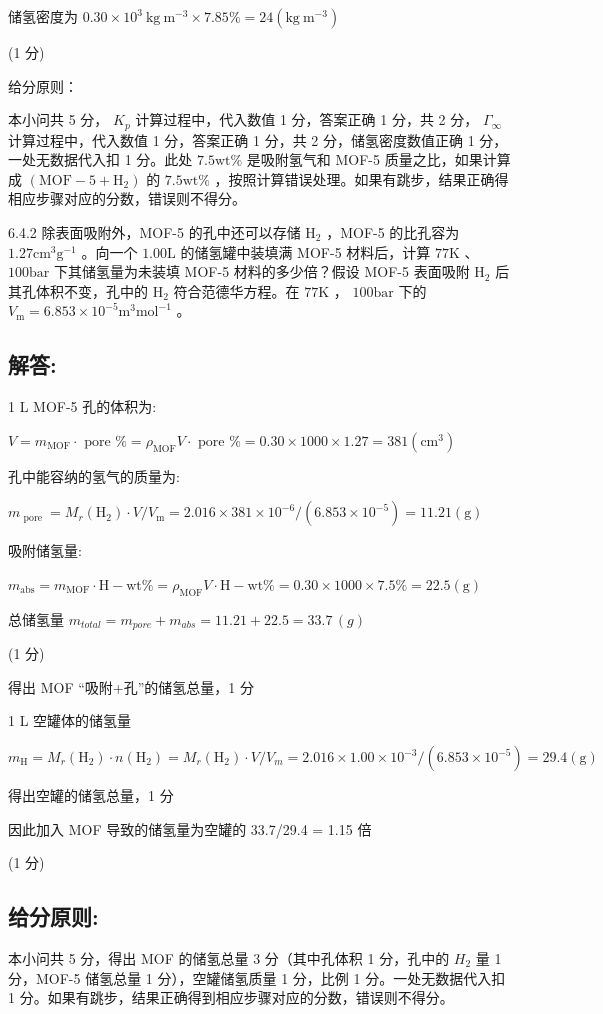 储氢密度为 $0.30 \times 10^{3} \mathrm{~kg} \mathrm{~m}^{-3} \times 7.85\% = 24 (\mathrm{kg} \mathrm{~m}^{-3})$

(1 分)

给分原则：

本小问共 5 分， $K_{p}$ 计算过程中，代入数值 1 分，答案正确 1 分，共 2 分， $\Gamma_{\infty}$ 计算过程中，代入数值 1 分，答案正确 1 分，共 2 分，储氢密度数值正确 1 分，一处无数据代入扣 1 分。此处 $7.5 \mathrm{wt}\%$ 是吸附氢气和 MOF-5 质量之比，如果计算成 $(\mathrm{MOF} - 5 + \mathrm{H}_{2})$ 的 $7.5 \mathrm{wt}\%$ ，按照计算错误处理。如果有跳步，结果正确得相应步骤对应的分数，错误则不得分。

6.4.2 除表面吸附外，MOF-5 的孔中还可以存储 $\mathrm{H}_{2}$ ，MOF-5 的比孔容为 $1.27\mathrm{cm}^{3}\mathrm{g}^{-1}$ 。向一个 $1.00\mathrm{L}$ 的储氢罐中装填满 MOF-5 材料后，计算 $77\mathrm{K}$ 、 $100\mathrm{bar}$ 下其储氢量为未装填 MOF-5 材料的多少倍？假设 MOF-5 表面吸附 $\mathrm{H}_{2}$ 后其孔体积不变，孔中的 $\mathrm{H}_{2}$ 符合范德华方程。在 $77\mathrm{K}$ ， $100\mathrm{bar}$ 下的 $V_{\mathrm{m}} = 6.853 \times 10^{-5}\mathrm{m}^{3}\mathrm{mol}^{-1}$ 。

\subsection*{解答:}

1 L MOF-5 孔的体积为:

$
V = m _ {\mathrm{MOF}} \cdot \text { pore } \% = \rho_ {\mathrm{MOF}} V \cdot \text { pore } \% = 0. 3 0 \times 1 0 0 0 \times 1. 2 7 = 3 8 1 (\mathrm{cm} ^ {3})\tag{1 分}
$

孔中能容纳的氢气的质量为:

$
m _ {\text { pore }} = M _ {r} \left(\mathrm{H} _ {2}\right) \cdot V / V _ {\mathrm{m}} = 2. 0 1 6 \times 3 8 1 \times 1 0 ^ {- 6} / (6. 8 5 3 \times 1 0 ^ {- 5}) = 1 1. 2 1 (\mathrm{g})\tag{1 分}
$

吸附储氢量:

$
m _ {\mathrm{abs}} = m _ {\mathrm{MOF}} \cdot \mathrm{H} - \mathrm{wt} \% = \rho_ {\mathrm{MOF}} V \cdot \mathrm{H} - \mathrm{wt} \% = 0. 3 0 \times 1 0 0 0 \times 7. 5 \% = 2 2. 5 (\mathrm{g})
$

总储氢量 $m_{total} = m_{pore} + m_{abs} = 11.21 + 22.5 = 33.7 \, (g)$

(1 分)

得出 MOF “吸附+孔”的储氢总量，1 分

1 L 空罐体的储氢量

$
m _ {\mathrm{H}} = M _ {r} \left(\mathrm{H} _ {2}\right) \cdot n \left(\mathrm{H} _ {2}\right) = M _ {r} \left(\mathrm{H} _ {2}\right) \cdot V / V _ {m} = 2. 0 1 6 \times 1. 0 0 \times 1 0 ^ {- 3} / (6. 8 5 3 \times 1 0 ^ {- 5}) = 2 9. 4 (\mathrm{g})\tag{1 分}
$

得出空罐的储氢总量，1 分

因此加入 MOF 导致的储氢量为空罐的 33.7/29.4 = 1.15 倍

(1 分)

\subsection*{给分原则:}

本小问共 5 分，得出 MOF 的储氢总量 3 分（其中孔体积 1 分，孔中的 $H_{2}$ 量 1 分，MOF-5 储氢总量 1 分），空罐储氢质量 1 分，比例 1 分。一处无数据代入扣 1 分。如果有跳步，结果正确得到相应步骤对应的分数，错误则不得分。
